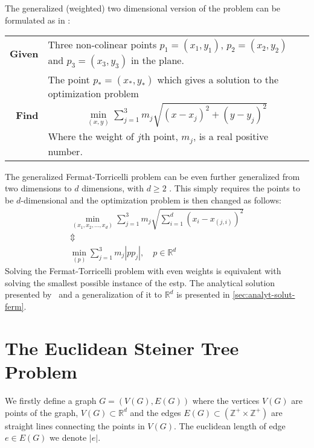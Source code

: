 The generalized (weighted) two dimensional version of the problem can be
formulated as in \textcite{uteshev2014}:
%
\begin{center}
  \begin{tabular}{rp{9cm}}
    \toprule
    \textbf{Given} & Three non-colinear points $p_1 = (x_1, y_1)$, $p_2 = (x_2,
                     y_2)$ and $p_3 = (x_3, y_3)$ in the plane. \\
    \textbf{Find} & The point $p_\ast = (x_\ast, y_\ast)$ which gives a solution
                    to the optimization problem
                    \begin{gather}
                      \min_{(x,y)} \sum_{j=1}^3 m_j \sqrt{{(x-x_j)}^2 + {(y-y_j)}^2}
                    \end{gather}
                    Where the weight of $j$th point, $m_j$, is a real positive number. \\
    \bottomrule
  \end{tabular}
\end{center}
%
The generalized Fermat-Torricelli problem can be even further generalized from
two dimensions to $d$ dimensions, with $d \ge 2$
\cite{fermattorricelliproblem}. This simply requires the points to be
$d$-dimensional and the optimization problem is then changed as follows:
%
\begin{gather}
  \min_{(x_1, x_2, \ldots, x_d)} \sum_{j=1}^3 m_j
  \sqrt{\sum_{i=1}^d {(x_i - x_{(j,i)})}^2 }
  \\ \Updownarrow \\
  \label{eq:4}
  \min_{(p)} \sum_{j=1}^3 m_j | p p_j |, \quad p \in \mathbb{R}^d
\end{gather}
%
Solving the Fermat-Torricelli problem with even weights is equivalent with solving
the smallest possible instance of the \acl{estp}. The analytical solution
presented by~\textcite{uteshev2014} and a generalization of it to $\mathbb{R}^d$ is
presented in \cref{sec:analyt-solut-ferm}.

\section{The Euclidean Steiner Tree Problem}
\label{sec:eucl-stein-tree}

We firstly define a graph $G = (V(G), E(G))$ where the vertices $V(G)$ are
points of the graph, $V(G) \subset \mathbb{R}^d$ and the edges
$E(G) \subset (\mathbb{Z}^{+} \times \mathbb{Z}^{+})$ are straight lines
connecting the points in $V(G)$. The euclidean length of edge $e \in E(G)$ we
denote $|e|$.

